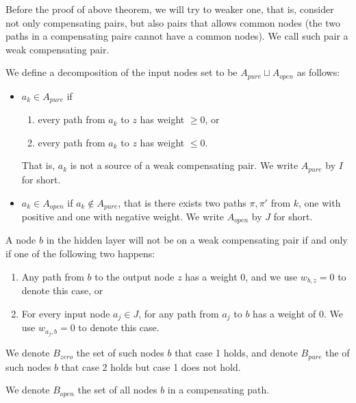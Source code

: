				
				Before the proof of above theorem, we will try to weaker one, that is, consider not only compensating pairs, but also pairs that allows common nodes (the two paths in a compensating pairs cannot have a common nodes). We call such pair a weak compensating pair.
				
				
				\begin{definition}
					We define a decomposition of the input nodes set to be $A_{pure}\sqcup A_{open}$ as follows:  
					\begin{itemize}
						\item $a_k \in A_{pure}$  if
						\begin{enumerate}
							\item every path from $a_k$ to $z$ has weight $\geq 0$, or
							\item every path from $a_k$ to $z$ has weight $\leq 0$. 
						
						\end{enumerate}
						That is, $a_k$ is not a source of a weak compensating pair. 	We write $A_{pure}$ by $I$ for short.
						\item $a_k \in A_{open}$ if $a_k \notin A_{pure}$, that is there exists two paths $\pi,\pi'$ from $k$, 
						one with positive and one with negative weight. 	We write $A_{open}$ by $J$ for short.
					\end{itemize}
				\end{definition} 
				
				
				
				\begin{lemma} \label{lem:open_node_2}
					A node $b$ in the hidden layer will not be on a weak compensating pair if and only if one of the following two happens:
					\begin{enumerate}
						\item Any path from $b$ to the output node $z$ has a weight $0$, and we use $w_{b,z}=0$ to denote this case, or
						\item For every input node $a_j\in J$, for any path from $a_j$ to $b$ has a weight of $0$. We use $w_{a_j,b}=0$ to denote this case.
					\end{enumerate}
					We denote $B_{zero}$ the set of such nodes $b$ that case 1 holds, and denote $B_{pure}$ the of such nodes $b$ that case 2 holds but case 1 does not hold.
					
					We denote $B_{open}$ the set of all nodes $b$ in a compensating path.
				\end{lemma}
				
